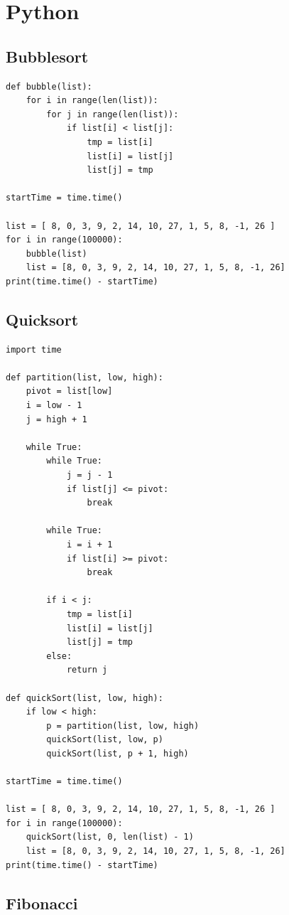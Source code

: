 \documentclass[a4paper, 12p]{book}
\begin{document}
\section{Python}

\subsection{Bubblesort}

\begin{lstlisting}
def bubble(list):
    for i in range(len(list)):
        for j in range(len(list)):
            if list[i] < list[j]:
                tmp = list[i]
                list[i] = list[j]
                list[j] = tmp

startTime = time.time()

list = [ 8, 0, 3, 9, 2, 14, 10, 27, 1, 5, 8, -1, 26 ]
for i in range(100000):
    bubble(list)
    list = [8, 0, 3, 9, 2, 14, 10, 27, 1, 5, 8, -1, 26]
print(time.time() - startTime)
\end{lstlisting}


\subsection{Quicksort}

\begin{lstlisting}
import time

def partition(list, low, high):
    pivot = list[low]
    i = low - 1
    j = high + 1

    while True:
        while True:
            j = j - 1
            if list[j] <= pivot:
                break

        while True:
            i = i + 1
            if list[i] >= pivot:
                break

        if i < j:
            tmp = list[i]
            list[i] = list[j]
            list[j] = tmp
        else:
            return j

def quickSort(list, low, high):
    if low < high:
        p = partition(list, low, high)
        quickSort(list, low, p)
        quickSort(list, p + 1, high)

startTime = time.time()

list = [ 8, 0, 3, 9, 2, 14, 10, 27, 1, 5, 8, -1, 26 ]
for i in range(100000):
    quickSort(list, 0, len(list) - 1)
    list = [8, 0, 3, 9, 2, 14, 10, 27, 1, 5, 8, -1, 26]
print(time.time() - startTime)
\end{lstlisting}

\subsection{Fibonacci}
\end{document}
